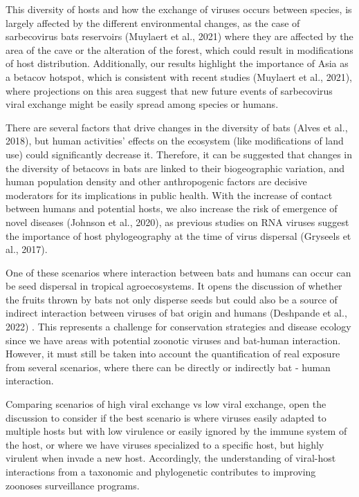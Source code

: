\documentclass[11pt]{article}
\begin{document}
This diversity of hosts and how the exchange of viruses occurs between
species, is largely affected by the different environmental changes, as
the case of sarbecovirus bats reservoirs (Muylaert et al., 2021) where
they are affected by the area of the cave or the alteration of the
forest, which could result in modifications of host distribution.
Additionally, our results highlight the importance of Asia as a betacov
hotspot, which is consistent with recent studies (Muylaert et al.,
2021), where projections on this area suggest that new future events of
sarbecovirus viral exchange might be easily spread among species or
humans.

There are several factors that drive changes in the diversity of bats
(Alves et al., 2018), but human activities' effects on the ecosystem
(like modifications of land use) could significantly decrease it.
Therefore, it can be suggested that changes in the diversity of betacovs
in bats are linked to their biogeographic variation, and human
population density and other anthropogenic factors are decisive
moderators for its implications in public health. With the increase of
contact between humans and potential hosts, we also increase the risk of
emergence of novel diseases (Johnson et al., 2020), as previous studies
on RNA viruses suggest the importance of host phylogeography at the time
of virus dispersal (Gryseels et al., 2017).

One of these scenarios where interaction between bats and humans can
occur can be seed dispersal in tropical agroecosystems. It opens the
discussion of whether the fruits thrown by bats not only disperse seeds
but could also be a source of indirect interaction between viruses of
bat origin and humans (Deshpande et al., 2022) . This represents a
challenge for conservation strategies and disease ecology since we have
areas with potential zoonotic viruses and bat-human interaction.
However, it must still be taken into account the quantification of real
exposure from several scenarios, where there can be directly or
indirectly bat - human interaction.

Comparing scenarios of high viral exchange vs low viral exchange, open
the discussion to consider if the best scenario is where viruses easily
adapted to multiple hosts but with low virulence or easily ignored by
the immune system of the host, or where we have viruses specialized to a
specific host, but highly virulent when invade a new host. Accordingly,
the understanding of viral-host interactions from a taxonomic and
phylogenetic contributes to improving zoonoses surveillance programs.
\end{document}
